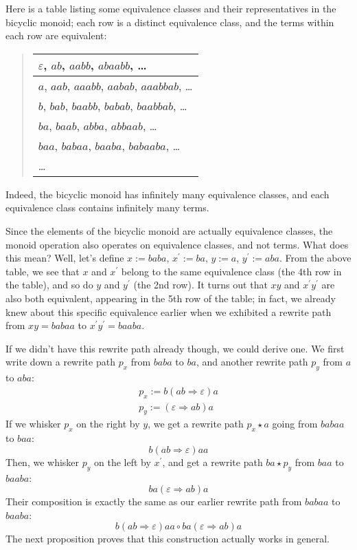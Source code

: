 \documentclass[../generics]{subfiles}
\begin{document}
\begin{example}
Here is a table listing some equivalence classes and their representatives in the bicyclic monoid; each row is a distinct equivalence class, and the terms within each row are equivalent:
\begin{quote}
\begin{tabular}{l}
\toprule
$\varepsilon$, $ab$, $aabb$, $abaabb$, \ldots\\
\midrule
$a$, $aab$, $aaabb$, $aabab$, $aaabbab$, \ldots\\
\midrule
$b$, $bab$, $baabb$, $babab$, $baabbab$, \ldots\\
\midrule
$ba$, $baab$, $abba$, $abbaab$, \ldots\\
\midrule
$baa$, $babaa$, $baaba$, $babaaba$, \ldots\\
\midrule
\ldots\\
\bottomrule
\end{tabular}
\end{quote}
Indeed, the bicyclic monoid has infinitely many equivalence classes, and each equivalence class contains infinitely many terms.

Since the elements of the bicyclic monoid are actually equivalence classes, the monoid operation also operates on equivalence classes, and not terms. What does this mean? Well, let's define $x := baba$, $x^\prime := ba$, $y := a$, $y^\prime := aba$. From the above table, we see that $x$ and $x^\prime$ belong to the same equivalence class (the 4th row in the table), and so do $y$ and $y^\prime$ (the 2nd row). It turns out that $xy$ and $x^\prime y^\prime$ are also both equivalent, appearing in the 5th row of the table; in fact, we already knew about this specific equivalence earlier when we exhibited a rewrite path from $xy=babaa$ to $x^\prime y^\prime=baaba$.

If we didn't have this rewrite path already though, we could derive one. We first write down a rewrite path $p_x$ from $baba$ to $ba$, and another rewrite path $p_y$ from $a$ to $aba$:
\begin{gather*}
p_x := b(ab\Rightarrow \varepsilon)a\\
p_y := (\varepsilon\Rightarrow ab)a
\end{gather*}
If we whisker $p_x$ on the right by $y$, we get a rewrite path $p_x\star a$ going from $babaa$ to $baa$:
\[b(ab\Rightarrow\varepsilon)aa\]
Then, we whisker $p_y$ on the left by $x^\prime$, and get a rewrite path $ba\star p_y$ from $baa$ to $baaba$:
\[ba(\varepsilon\Rightarrow ab)a\]
Their composition is exactly the same as our earlier rewrite path from $babaa$ to $baaba$:
\[b(ab\Rightarrow\varepsilon)aa\circ ba(\varepsilon\Rightarrow ab)a\]
The next proposition proves that this construction actually works in general.
\end{example}
\end{document}
